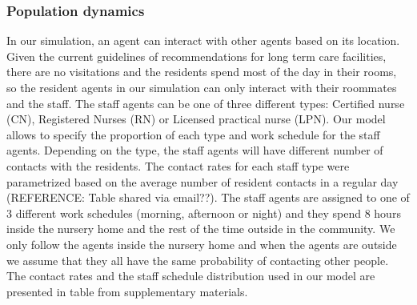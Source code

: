 \documentclass[
]{article}
\begin{document}
\hypertarget{population-dynamics}{%
\subsubsection{Population dynamics}\label{population-dynamics}}

In our simulation, an agent can interact with other agents based on its
location. Given the current guidelines of recommendations for long term
care facilities, there are no visitations and the residents spend most
of the day in their rooms, so the resident agents in our simulation can
only interact with their roommates and the staff. The staff agents can
be one of three different types: Certified nurse (CN), Registered Nurses
(RN) or Licensed practical nurse (LPN). Our model allows to specify the
proportion of each type and work schedule for the staff agents.
Depending on the type, the staff agents will have different number of
contacts with the residents. The contact rates for each staff type were
parametrized based on the average number of resident contacts in a
regular day (REFERENCE: Table shared via email??). The staff agents are
assigned to one of 3 different work schedules (morning, afternoon or
night) and they spend 8 hours inside the nursery home and the rest of
the time outside in the community. We only follow the agents inside the
nursery home and when the agents are outside we assume that they all
have the same probability of contacting other people. The contact rates
and the staff schedule distribution used in our model are presented in
table from supplementary materials.
\end{document}

